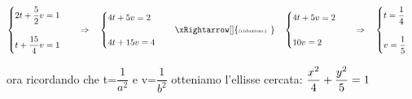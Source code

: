 \begin{esempio}
\vspace{6pt}
\(\begin{cases}  2t+\dfrac{5}{2}v =1 \\ \\ t+\dfrac{15}{4}v =1  
\end{cases} \quad \Rightarrow \quad \begin{cases}  4t+5v =2 \\ \\ 4t+15v =4  
\end{cases} \quad \xRightarrow[]{\text{\tiny (riduzione) \;}} \quad \begin{cases}  4t+5v =2 \\ \\ 10v =2 \end{cases}
\quad \Rightarrow \quad   \begin{cases}  t = \dfrac{1}{4} \\ \\ v =\dfrac{1}{5} \end{cases}
 \)

\vspace{6pt}
ora ricordando che t=$\dfrac{1}{a^{2}}$ e v=$\dfrac{1}{b^{2}}$
otteniamo l'ellisse cercata: 
$ \vspace{2cm} \dfrac{x^{2}}{4} + \dfrac{y^{2}}{5} = 1$
\end{esempio}

